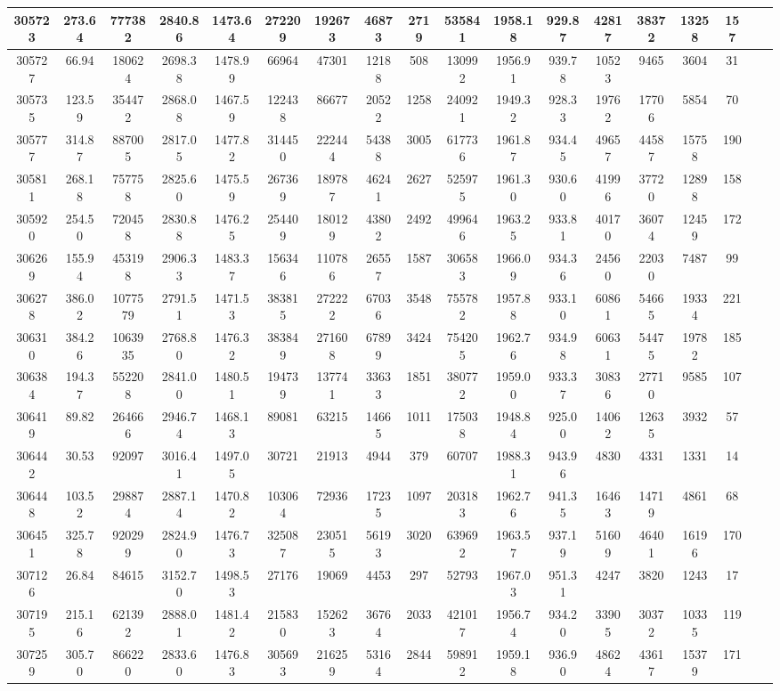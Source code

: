 \documentclass[10pt]{extarticle}
\begin{document}
\begin{longtable}{|c|c|c|c|c|c|c|c|c|c|c|c|c|c|c|c|c|c|}
\hline 
305723&273.64&777382&2840.86&1473.64&272209&192673&46873&2719&535841&1958.18&929.87&42817&38372&13258&157 \\ 
\hline 
305727&66.94&180624&2698.38&1478.99&66964&47301&12188&508&130992&1956.91&939.78&10523&9465&3604&31 \\ 
\hline 
305735&123.59&354472&2868.08&1467.59&122438&86677&20522&1258&240921&1949.32&928.33&19762&17706&5854&70 \\ 
\hline 
305777&314.87&887005&2817.05&1477.82&314450&222444&54388&3005&617736&1961.87&934.45&49657&44587&15758&190 \\ 
\hline 
305811&268.18&757758&2825.60&1475.59&267369&189787&46241&2627&525975&1961.30&930.60&41996&37720&12898&158 \\ 
\hline 
305920&254.50&720458&2830.88&1476.25&254409&180129&43802&2492&499646&1963.25&933.81&40170&36074&12459&172 \\ 
\hline 
306269&155.94&453198&2906.33&1483.37&156346&110786&26557&1587&306583&1966.09&934.36&24560&22030&7487&99 \\ 
\hline 
306278&386.02&1077579&2791.51&1471.53&383815&272222&67036&3548&755782&1957.88&933.10&60861&54665&19334&221 \\ 
\hline 
306310&384.26&1063935&2768.80&1476.32&383849&271608&67899&3424&754205&1962.76&934.98&60631&54475&19782&185 \\ 
\hline 
306384&194.37&552208&2841.00&1480.51&194739&137741&33633&1851&380772&1959.00&933.37&30836&27710&9585&107 \\ 
\hline 
306419&89.82&264666&2946.74&1468.13&89081&63215&14665&1011&175038&1948.84&925.00&14062&12635&3932&57 \\ 
\hline 
306442&30.53&92097&3016.41&1497.05&30721&21913&4944&379&60707&1988.31&943.96&4830&4331&1331&14 \\ 
\hline 
306448&103.52&298874&2887.14&1470.82&103064&72936&17235&1097&203183&1962.76&941.35&16463&14719&4861&68 \\ 
\hline 
306451&325.78&920299&2824.90&1476.73&325087&230515&56193&3020&639692&1963.57&937.19&51609&46401&16196&170 \\ 
\hline 
307126&26.84&84615&3152.70&1498.53&27176&19069&4453&297&52793&1967.03&951.31&4247&3820&1243&17 \\ 
\hline 
307195&215.16&621392&2888.01&1481.42&215830&152623&36764&2033&421017&1956.74&934.20&33905&30372&10335&119 \\ 
\hline 
307259&305.70&866220&2833.60&1476.83&305693&216259&53164&2844&598912&1959.18&936.90&48624&43617&15379&171 \\ 

\end{longtable}
\end{document}
